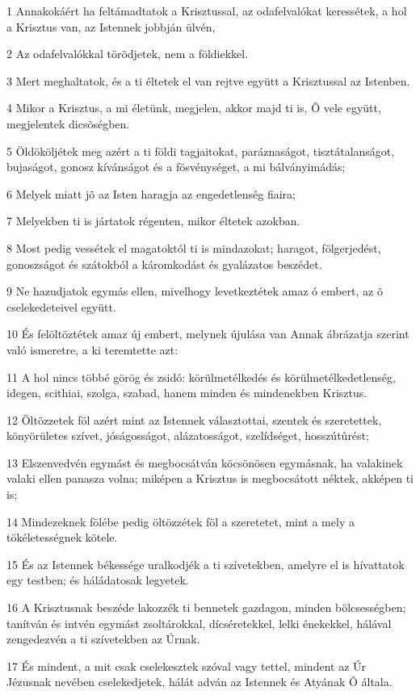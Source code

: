 \par 1 Annakokáért ha feltámadtatok a Krisztussal, az odafelvalókat keressétek, a hol a Krisztus van, az Istennek jobbján ülvén,
\par 2 Az odafelvalókkal törõdjetek, nem a földiekkel.
\par 3 Mert meghaltatok, és a ti éltetek el van rejtve együtt a Krisztussal az Istenben.
\par 4 Mikor a Krisztus, a mi életünk, megjelen, akkor majd ti is, Õ vele együtt, megjelentek dicsõségben.
\par 5 Öldököljétek meg azért a ti földi tagjaitokat, paráznaságot, tisztátalanságot, bujaságot, gonosz kívánságot és a fösvénységet, a mi bálványimádás;
\par 6 Melyek miatt jõ az Isten haragja az engedetlenség fiaira;
\par 7 Melyekben ti is jártatok régenten, mikor éltetek azokban.
\par 8 Most pedig vessétek el magatoktól ti is mindazokat; haragot, fölgerjedést, gonoszságot és szátokból a káromkodást és gyalázatos beszédet.
\par 9 Ne hazudjatok egymás ellen, mivelhogy levetkeztétek amaz ó embert, az õ cselekedeteivel együtt.
\par 10 És felöltöztétek amaz új embert, melynek újulása van Annak ábrázatja szerint való ismeretre, a ki teremtette azt:
\par 11 A hol nincs többé görög és zsidó: körülmetélkedés és körülmetélkedetlenség, idegen, scithiai, szolga, szabad, hanem minden és mindenekben Krisztus.
\par 12 Öltözzetek föl azért mint az Istennek választottai, szentek és szeretettek, könyörületes szívet, jóságosságot, alázatosságot, szelídséget, hosszútûrést;
\par 13 Elszenvedvén egymást és megbocsátván köcsönösen egymásnak, ha valakinek valaki ellen panasza volna; miképen a Krisztus is megbocsátott néktek, akképen ti is;
\par 14 Mindezeknek fölébe pedig öltözzétek föl a szeretetet, mint a mely a tökéletességnek kötele.
\par 15 És az Istennek békessége uralkodjék a ti szívetekben, amelyre el is hívattatok egy testben; és háládatosak legyetek.
\par 16 A Krisztusnak beszéde lakozzék ti bennetek gazdagon, minden bölcsességben; tanítván és intvén egymást zsoltárokkal, dícséretekkel, lelki énekekkel, hálával zengedezvén a ti szívetekben az Úrnak.
\par 17 És mindent, a mit csak cselekesztek szóval vagy tettel, mindent az Úr Jézusnak nevében cselekedjetek, hálát adván az Istennek és Atyának Õ általa.
